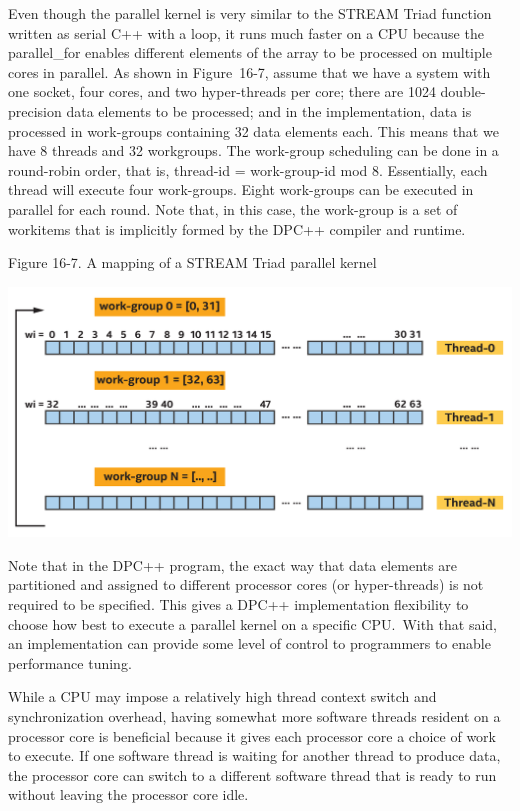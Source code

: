 Even though the parallel kernel is very similar to the STREAM Triad function written as serial C++ with a loop, it runs much faster on a CPU because the parallel\_for enables different elements of the array to be processed on multiple cores in parallel. As shown in Figure 16-7, assume that we have a system with one socket, four cores, and two hyper-threads per core; there are 1024 double-precision data elements to be processed; and in the implementation, data is processed in work-groups containing 32 data elements each. This means that we have 8 threads and 32 workgroups. The work-group scheduling can be done in a round-robin order, that is, thread-id = work-group-id mod 8. Essentially, each thread will execute four work-groups. Eight work-groups can be executed in parallel for each round. Note that, in this case, the work-group is a set of workitems that is implicitly formed by the DPC++ compiler and runtime.\par

\hspace*{\fill} \par %
Figure 16-7. A mapping of a STREAM Triad parallel kernel
\begin{center}
	\includegraphics[width=1.0\textwidth]{content/chapter-16/images/5}
\end{center}

Note that in the DPC++ program, the exact way that data elements are partitioned and assigned to different processor cores (or hyper-threads) is not required to be specified. This gives a DPC++ implementation flexibility to choose how best to execute a parallel kernel on a specific CPU. With that said, an implementation can provide some level of control to programmers to enable performance tuning.\par

While a CPU may impose a relatively high thread context switch and synchronization overhead, having somewhat more software threads resident on a processor core is beneficial because it gives each processor core a choice of work to execute. If one software thread is waiting for another thread to produce data, the processor core can switch to a different software thread that is ready to run without leaving the processor core idle.\par

